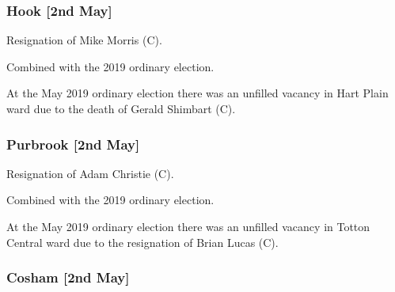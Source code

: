 \begin{resultsiii}
	
	\subsubsection*{Hook \hspace*{\fill}\nolinebreak[1]%
		\enspace\hspace*{\fill}
		[2nd May]}
	
	
	Resignation of Mike Morris (C).
	
	Combined with the 2019 ordinary election.
	
	
	At the May 2019 ordinary election there was an unfilled vacancy in Hart Plain ward due to the death of Gerald Shimbart (C).
	
	\subsubsection*{Purbrook \hspace*{\fill}\nolinebreak[1]%
		\enspace\hspace*{\fill}
		[2nd May]}
	
	
	Resignation of Adam Christie (C).
	
	Combined with the 2019 ordinary election.
	
	
	At the May 2019 ordinary election there was an unfilled vacancy in Totton Central ward due to the resignation of Brian Lucas (C).
	
	
	\subsubsection*{Cosham \hspace*{\fill}\nolinebreak[1]%
		\enspace\hspace*{\fill}
		[2nd May]}
	
	

\end{resultsiii}
